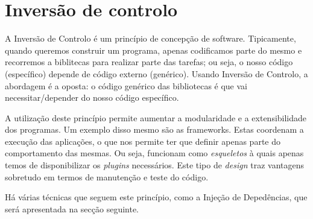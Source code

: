 \section{Inversão de controlo}

A Inversão de Controlo é um princípio de concepção de software. Tipicamente, quando queremos construir um programa, apenas codificamos parte do mesmo e recorremos a biblitecas para realizar parte das tarefas; ou seja, o nosso código (específico) depende de código externo (genérico). Usando Inversão de Controlo, a abordagem é a oposta: o código genérico das bibliotecas é que vai necessitar/depender do nosso código específico.

A utilização deste princípio permite aumentar a modularidade e a extensibilidade dos programas. Um exemplo disso mesmo são as frameworks. Estas coordenam a execução das aplicações, o que nos permite ter que definir apenas parte do comportamento das mesmas. Ou seja, funcionam como \textit{esqueletos} à quais apenas temos de disponibilizar os \textit{plugins} necessários. Este tipo de \textit{design} traz vantagens sobretudo em termos de manutenção e teste do código.

Há várias técnicas que seguem este princípio, como a Injeção de Depedências, que será apresentada na secção seguinte.
